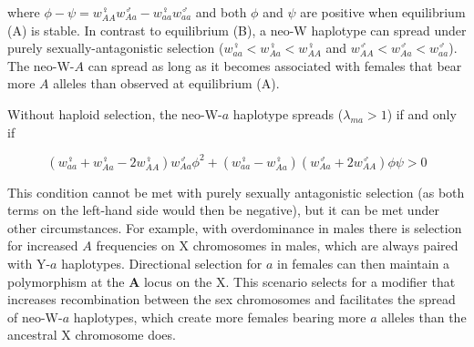 \documentclass[12pt]{article}
\begin{document}
\noindent  
where $\phi-\psi=w_{AA}^\female w_{Aa}^\male-w_{aa}^\female w_{aa}^\male$ and both $\phi$ and $\psi$ are positive when equilibrium (A) is stable. 
In contrast to equilibrium (B), a neo-W haplotype can spread under purely sexually-antagonistic selection  ($w_{aa}^\female<w_{Aa}^\female<w_{AA}^\female$ and $w_{AA}^\male<w_{Aa}^\male<w_{aa}^\male$).
The neo-W-$A$ can spread as long as it becomes associated with females that bear more $A$ alleles than observed at equilibrium (A). 

Without haploid selection, the neo-W-$a$ haplotype spreads ($\lambda_{ma}>1$) if and only if

\begin{equation}\label{eq:BeqWaspread}
(w_{aa}^\female + w_{Aa}^\female-2w_{AA}^\female)w_{Aa}^\male \phi^2 + (w_{aa}^\female-w_{Aa}^\female)(w_{Aa}^\male+2w_{AA}^\male) \phi \psi >0
\end{equation}

\noindent
This condition cannot be met with purely sexually antagonistic selection (as both terms on the left-hand side would then be negative), but it can be met under other circumstances. 
For example, with overdominance in males there is selection for increased $A$ frequencies on X chromosomes in males, which are always paired with Y-$a$ haplotypes.
Directional selection for $a$ in females can then maintain a polymorphism at the $\textbf{A}$ locus on the X.
This scenario selects for a modifier that increases recombination between the sex chromosomes \citep[e.g., blue region of Figure 2d in][]{Otto2014} and facilitates the spread of neo-W-$a$ haplotypes, which create more females bearing more $a$ alleles than the ancestral X chromosome does. 

\end{document}
